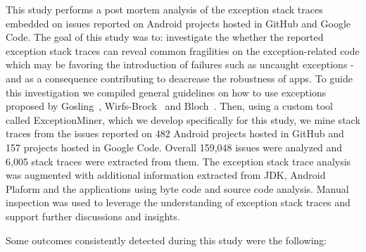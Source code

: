 \documentclass[conference]{IEEEtran}
\begin{document}


This study performs a post mortem analysis of the exception stack traces embedded on issues
reported on Android projects hosted in GitHub and Google Code. 
The goal of this study was to: investigate the whether the reported exception stack traces
 can reveal common fragilities on the exception-related code which may be favoring 
the introduction of failures such as uncaught exceptions - and as a consequence
 contributing to deacrease the robustness of apps.
To guide this investigation we compiled general guidelines on how to use
exceptions proposed by Gosling~\cite{gosling2000java},
Wirfs-Brock~\cite{wirfs2006toward} and Bloch~\cite{bloch2008effective}.
Then, using a custom tool called ExceptionMiner,
 which we develop specifically for this study, we mine stack traces from the issues reported 
on 482 Android projects hosted in GitHub and 157 projects hosted in Google Code.
Overall 159,048 issues were analyzed and 6,005 stack traces were extracted from them.
The exception stack trace analysis was augmented with additional information
extracted from JDK, Android Plaform and the applications using byte code 
and source code analysis. Manual inspection was used to leverage the understanding 
of exception stack traces and support further discussions and insights.



Some outcomes consistently detected during this study were the following:
\end{document}
